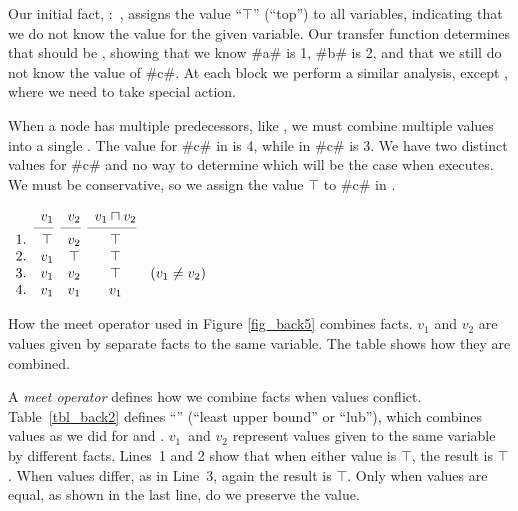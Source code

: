 \documentclass[12pt]{report}
\begin{document}
Our initial fact, :~, assigns the value ``$\top$'' (``top'') to all variables,
indicating that we do not know the value for the given variable. Our
transfer function determines that  should be
, showing that we know #a# is 1, #b# is 2, and
that we still do not know the value of #c#. At each block we perform a
similar analysis, except , where we need to
  take special action.

When a node has multiple predecessors, like ,
we must combine multiple \outBa values into a single \inBa. The value
for #c# in  is 4, while in 
#c# is 3. We have two distinct values for #c# and no way to determine
which will be the case when  executes. We
must be conservative, so we assign the value $\top$ to #c# in
.

\begin{table}[tbh]
  \centering
  \figbegin
  \begin{math}
    \begin{array}{ccccc}
      & v_1 & v_2 & v_1 \lub v_2 \\
      \cmidrule(r){2-2}\cmidrule(r){3-3}\cmidrule(r){4-4}
      1. & \top & v_2 & \top & \\ 
      2. & v_1 & \top & \top & \\
      3. & v_1 & v_2 & \top & \text{($v_1 \neq v_2$)}\\
      4. & v_1 & v_1 & v_1 
    \end{array}
  \end{math}
  \caption{How the meet operator used in Figure \ref{fig_back5}
    combines facts. $v_1$ and $v_2$ are values given by separate
    \outBa facts to the same variable. The table shows how they are
    combined.}
  \label{tbl_back2}
  \figend
\end{table}

A \emph{meet operator} defines how we combine facts when values
conflict. Table~\ref{tbl_back2} defines ``\lub'' (``least upper
bound'' or ``lub''), which combines values as we did for
 and . $v_1$~and $v_2$
represent values given to the same variable by different
facts. Lines~1 and 2 show that when either value is $\top$, the result
is $\top$. When values differ, as in Line~3, again the result is
$\top$. Only when values are equal, as shown in the last line, do we
preserve the value.
\end{document}
